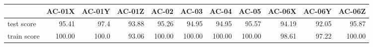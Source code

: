 \begin{tabular}{lrrrrrrrrrr}
\toprule
{} &  AC-01X &  AC-01Y &  AC-01Z &   AC-02 &   AC-03 &   AC-04 &   AC-05 &  AC-06X &  AC-06Y &  AC-06Z \\
\midrule
test score  &   95.41 &    97.4 &   93.88 &   95.26 &   94.95 &   94.95 &   95.57 &   94.19 &   92.05 &   95.87 \\
train score &  100.00 &   100.0 &   93.06 &  100.00 &  100.00 &  100.00 &  100.00 &   98.61 &   97.22 &  100.00 \\
\bottomrule
\end{tabular}
